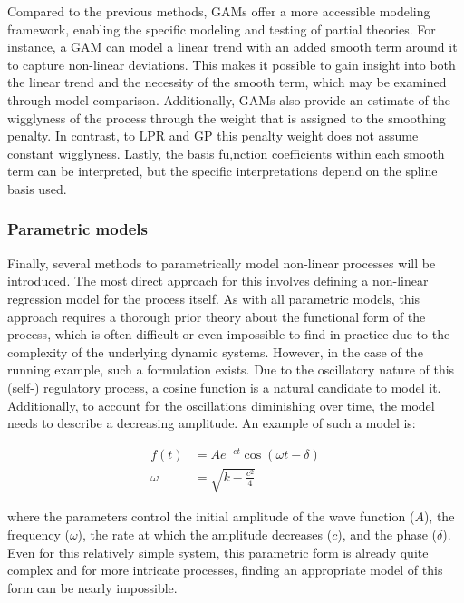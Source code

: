 \documentclass[man, floatsintext]{apa7}
\begin{document}
Compared to the previous methods, GAMs offer a more accessible modeling
framework,
enabling the specific modeling and testing of partial theories. For instance, a
GAM can model a linear trend with an added smooth term around it to capture
non-linear deviations. This makes it possible to gain insight into both
the linear trend and the necessity of the smooth term, which may be examined
through model comparison.
Additionally, GAMs also provide an estimate of the wigglyness
of the process through the weight that is assigned to the smoothing penalty.
In contrast, to LPR and GP
this penalty weight does not assume constant wigglyness. Lastly, the
basis fu,nction coefficients within each smooth term can be interpreted,
but the specific interpretations depend on the spline basis used.

\subsubsection{Parametric models}

Finally, several methods to parametrically model non-linear processes will be
introduced. The most direct approach for this involves defining a non-linear
regression model for the process itself. As with all parametric models,
this approach requires a thorough
prior theory about the functional form of the process, which is often difficult
or even impossible to find in practice due to the
complexity of the underlying dynamic systems.
However, in the case of the running example, such a formulation exists.
Due to the oscillatory nature of this (self-) regulatory process,
a cosine function is a natural candidate to model it.
Additionally, to account for the oscillations diminishing over time,
the model needs to describe a decreasing amplitude. An example of such a
model is:

\begin{equation}
  \begin{aligned}
    f(t)   & = A e^{-c t} \cos(\omega t - \delta) \\
    \omega & = \sqrt{k - \frac{c^2}{4}}
  \end{aligned}
\end{equation}

\noindent where the parameters control the initial amplitude of the wave
function ($A$),
the frequency ($\omega$), the rate at which the amplitude decreases ($c$), and
the phase ($\delta$). Even for this relatively simple system, this parametric
form is already quite complex and for more intricate processes, finding an
appropriate model of this form can be nearly impossible.
\end{document}
